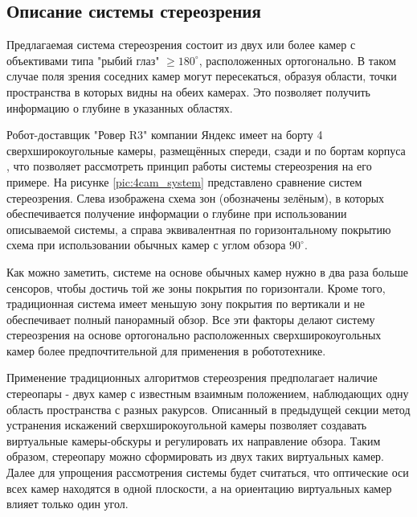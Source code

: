 \subsection{Описание системы стереозрения}

Предлагаемая система стереозрения состоит из двух или более камер с объективами типа "рыбий глаз" $\geqslant 180^\circ$,
расположенных ортогонально. В таком случае поля зрения соседних камер могут пересекаться, 
образуя  области, точки пространства в которых видны на обеих камерах. Это позволяет получить информацию о 
глубине в указанных областях. %

Робот-доставщик "Ровер R3"  компании Яндекс имеет на борту 4 сверхширокоугольные камеры, размещённых спереди, сзади и по бортам 
корпуса \cite{}, что позволяет рассмотреть принцип работы системы стереозрения на его примере. На рисунке \ref{pic:4cam_system} 
представлено сравнение систем стереозрения. Слева изображена схема зон (обозначены зелёным), в которых обеспечивается получение информации о глубине
 при использовании описываемой системы, а справа эквивалентная по горизонтальному  покрытию схема при использовании обычных камер 
 с углом обзора $90^\circ$. 
 

Как можно заметить, системе на основе обычных камер нужно в два раза больше сенсоров, чтобы достичь той же зоны покрытия 
по горизонтали.  Кроме того, традиционная система имеет меньшую зону покрытия по вертикали и не обеспечивает полный 
панорамный обзор. Все эти факторы делают систему стереозрения на основе ортогонально расположенных сверхширокоугольных камер 
более предпочтительной для применения в робототехнике.  %

Применение традиционных алгоритмов стереозрения предполагает наличие стереопары - двух камер с известным взаимным положением,   %
наблюдающих  одну область пространства с разных ракурсов. Описанный в предыдущей секции метод  устранения искажений 
сверхширокоугольной камеры позволяет создавать виртуальные камеры-обскуры и регулировать их направление обзора. Таким образом,
стереопару можно сформировать из двух таких виртуальных камер.  %
Далее для упрощения рассмотрения системы будет считаться, что оптические оси всех камер находятся в одной плоскости, 
а на ориентацию виртуальных камер влияет только один угол. %

